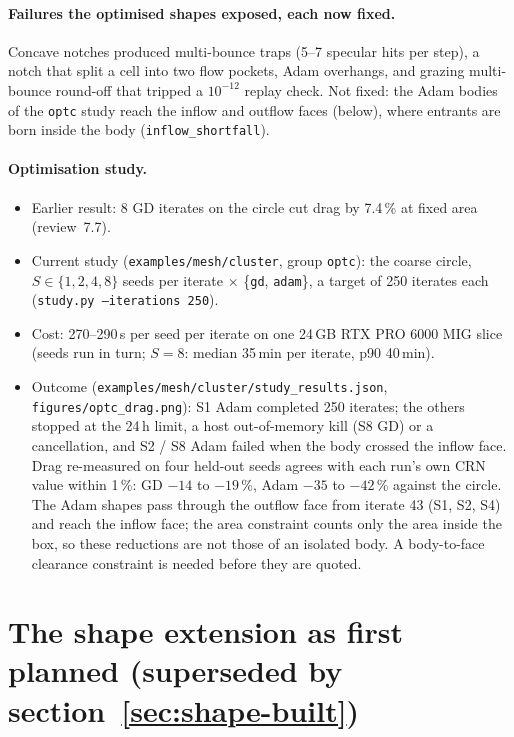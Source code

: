 \documentclass[11pt,a4paper]{article}
\numberwithin{equation}{section}
\newcommand{\code}[1]{\texttt{#1}}
\begin{document}
\paragraph{Failures the optimised shapes exposed, each now fixed.}
Concave notches produced multi-bounce traps (5--7 specular hits per step), a notch
that split a cell into two flow pockets, Adam overhangs, and grazing multi-bounce
round-off that tripped a $10^{-12}$ replay check.  Not fixed: the Adam bodies of the
\code{optc} study reach the inflow and outflow faces (below), where entrants are born
inside the body (\code{inflow\_shortfall}).

\paragraph{Optimisation study.}
\begin{itemize}
\item Earlier result: 8 GD iterates on the circle cut drag by 7.4\,\% at fixed area
  (review~7.7).
\item Current study (\code{examples/mesh/cluster}, group \code{optc}): the coarse
  circle, $S\in\{1,2,4,8\}$ seeds per iterate $\times$ \{\code{gd}, \code{adam}\},
  a target of 250 iterates each (\code{study.py --iterations 250}).
\item Cost: 270--290\,s per seed per iterate on one 24\,GB RTX PRO 6000 MIG slice
  (seeds run in turn; $S = 8$: median 35\,min per iterate, p90 40\,min).
\item Outcome (\code{examples/mesh/cluster/study\_results.json},
  \code{figures/optc\_drag.png}): S1 Adam completed 250 iterates; the others stopped at
  the 24\,h limit, a host out-of-memory kill (S8 GD) or a cancellation, and S2 / S8 Adam
  failed when the body crossed the inflow face.  Drag re-measured on four held-out seeds
  agrees with each run's own CRN value within 1\,\%: GD $-14$ to $-19\,\%$, Adam $-35$
  to $-42\,\%$ against the circle.  The Adam shapes pass through the outflow face from
  iterate 43 (S1, S2, S4) and reach the inflow face; the area constraint counts only the
  area inside the box, so these reductions are not those of an isolated body.  A
  body-to-face clearance constraint is needed before they are quoted.
\end{itemize}

\section{The shape extension as first planned (superseded by section~\ref{sec:shape-built})}
\label{sec:shape}
\end{document}
